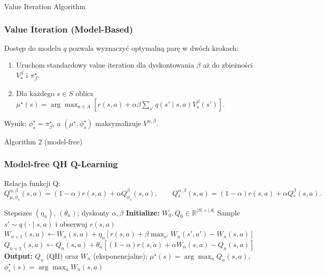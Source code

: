 \begin{frame}{Value Iteration Algorithm}
\frametitle{Value Iteration (Model-Based)}
Dostęp do modelu $q$ pozwala wyznaczyć optymalną parę w dwóch krokach:
\begin{enumerate}
\item Uruchom standardowy value iteration dla dyskontowania $\beta$ aż do zbieżności $V^{\beta}_\star$ i $\pi^\star_\beta$.
\item Dla każdego $s \in S$ oblicz $\mu^\star(s) = \arg\max_{a \in A} \left[ r(s, a) + \alpha \beta \sum_{s'} q(s'\mid s, a) V^{\beta}_\star(s') \right]$.
\end{enumerate}
Wynik: $\phi_s^\star = \pi^\star_\beta$, a $(\mu^\star, \phi_s^\star)$ maksymalizuje $V^{\alpha, \beta}$.
\end{frame}

\begin{frame}[fragile]{Algorithm 2 (model-free)}
\frametitle{Model-free QH Q-Learning}
Relacja funkcji Q:
\begin{equation}
Q^{\alpha, \beta}_{\mu, \phi_s}(s,a) = (1 - \alpha) r(s,a) + \alpha Q^{\beta}_{\phi_s}(s,a), \qquad Q^{\alpha, \beta}_*(s,a) = (1 - \alpha) r(s,a) + \alpha Q^{\beta}_*(s,a).
\end{equation}

\begin{algorithm}[H]
\caption{QH Q-learning (model-free)}
\begin{algorithmic}[1]
\REQUIRE Stepsizes $(\eta_n)$, $(\theta_n)$; dyskonty $\alpha, \beta$
\STATE \textbf{Initialize:} $W_0, Q_0 \in \mathbb{R}^{|S| \times |A|}$
\STATE Sample $s' \sim q(\cdot\mid s, a)$ i obserwuj $r(s, a)$
\STATE $W_{n+1}(s, a) \leftarrow W_n(s, a) + \eta_n \left[ r(s, a) + \beta \max_{a'} W_n(s', a') - W_n(s, a) \right]$
\STATE $Q_{n+1}(s, a) \leftarrow Q_n(s, a) + \theta_n \left[ (1 - \alpha) r(s, a) + \alpha W_n(s, a) - Q_n(s, a) \right]$
\ENDFOR
\ENDFOR
\STATE \textbf{Output:} $Q_n$ (QH) oraz $W_n$ (eksponencjalne); $\mu^\star(s) = \arg\max_a Q_n(s, a)$, $\phi_s^\star(s) = \arg\max_a W_n(s, a)$
\end{algorithmic}
\end{algorithm}
\end{frame}

